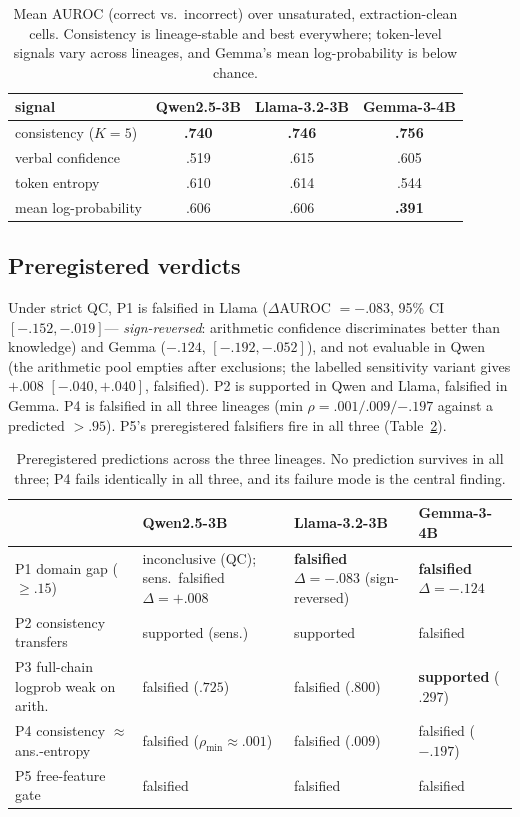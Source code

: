 \documentclass[10pt]{article}
\begin{document}
\begin{table}[t]
\centering
\caption{Mean AUROC (correct vs.\ incorrect) over unsaturated, extraction-clean cells.
Consistency is lineage-stable and best everywhere; token-level signals vary across lineages,
and Gemma's mean log-probability is below chance.}
\label{tab:signalmap}
\begin{tabular}{lccc}
\toprule
signal & Qwen2.5-3B & Llama-3.2-3B & Gemma-3-4B \\
\midrule
consistency ($K{=}5$)   & \textbf{.740} & \textbf{.746} & \textbf{.756} \\
verbal confidence       & .519 & .615 & .605 \\
token entropy           & .610 & .614 & .544 \\
mean log-probability    & .606 & .606 & \textbf{.391} \\
\bottomrule
\end{tabular}
\end{table}

\subsection{Preregistered verdicts}
Under strict QC, P1 is falsified in Llama ($\Delta$AUROC $= -.083$, 95\% CI $[-.152, -.019]$---
\emph{sign-reversed}: arithmetic confidence discriminates better than knowledge) and Gemma
($-.124$, $[-.192,-.052]$), and not evaluable in Qwen (the arithmetic pool empties after
exclusions; the labelled sensitivity variant gives $+.008$ $[-.040, +.040]$, falsified). P2 is
supported in Qwen and Llama, falsified in Gemma. P4 is falsified in all three lineages
(min $\rho = .001 / .009 / {-.197}$ against a predicted $> .95$). P5's preregistered falsifiers
fire in all three (Table~\ref{tab:verdicts}).

\begin{table}[t]
\centering
\caption{Preregistered predictions across the three lineages. No prediction survives in all
three; P4 fails identically in all three, and its failure mode is the central finding.}
\label{tab:verdicts}
\small
\begin{tabular}{lp{3.4cm}p{3.4cm}p{3.4cm}}
\toprule
 & Qwen2.5-3B & Llama-3.2-3B & Gemma-3-4B \\
\midrule
P1 domain gap ($\ge .15$) & inconclusive (QC); sens.\ falsified $\Delta{=}{+}.008$ & \textbf{falsified} $\Delta{=}{-}.083$ (sign-reversed) & \textbf{falsified} $\Delta{=}{-}.124$ \\
P2 consistency transfers & supported (sens.) & supported & falsified \\
P3 full-chain logprob weak on arith. & falsified ($.725$) & falsified ($.800$) & \textbf{supported} ($.297$) \\
P4 consistency $\approx$ ans.-entropy & falsified ($\rho_{\min}{\approx}.001$) & falsified ($.009$) & falsified ($-.197$) \\
P5 free-feature gate & falsified & falsified & falsified \\
\bottomrule
\end{tabular}
\end{table}
\end{document}
